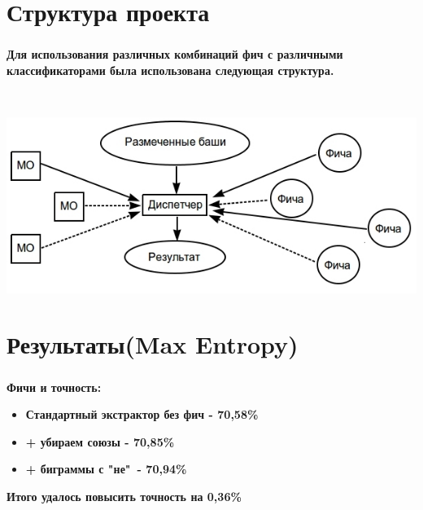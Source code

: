 \documentclass[t]{beamer}
\begin{document}
	
	
	
	\section{Структура проекта}
	\begin{frame}
		\frametitle{\insertsection}
		\textbf{Для использования различных комбинаций фич с различными классификаторами была использована следующая структура.}
		
		
		~
		
		\includegraphics[scale=0.52]{images/TheManager.jpg}
	\end{frame}	
	
	
     \section{Результаты(Max Entropy)}
    \begin{frame}
		\frametitle{\insertsection}
    	\textbf{Фичи и точность:}
        \begin{itemize}
        	\item \textbf{Стандартный экстрактор без фич - 70,58\%}
            \item \textbf{+ убираем союзы - 70,85\%}
            \item \textbf{+ биграммы с "не"\ - 70,94\%}
        \end{itemize}
        \textbf{\newline \newline Итого удалось повысить точность на 0,36\%}
	\end{frame}
    
    
    
\end{document}
